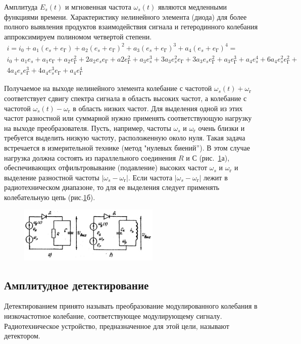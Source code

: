 Амплитуда $E_s(t)$ и мгновенная частота $\omega_s(t)$ являются медленными функциями времени. Характеристику нелинейного элемента (диода) для более полного выявления продуктов взаимодействия сигнала и гетеродинного колебания аппроксимируем полиномом четвертой степени.
\begin{gather}
	i=i_0+a_1(e_s+e_{\text{Г}})+a_2(e_s+e_{\text{Г}})^2+
	a_3(e_s+e_{\text{Г}})^3
	+a_4(e_s+e_{\text{Г}})^4= \\
	i_0+a_1e_s+a_1e_{\text{Г}}+a_2e_{\text{Г}}^2+
	2a_2e_se_{\text{Г}}+a2e_{\text{Г}}^2+a_3e_s^3+
	3a_3e_s^2e_{\text{Г}}+3a_3e_se_{\text{Г}}^2+
	a_3e_{\text{Г}}^3+a_4e_s^4+6a_4e_s^2e_{\text{Г}}^2+\\
	4a_4e_se_{\text{Г}}^3+4a_4e_s^3e_{\text{Г}}+a_4e_{\text{Г}}^4
\end{gather}

Получаемое на выходе нелинейного элемента колебание с частотой $\omega_s(t)+\omega_{\text{г}}$ соответствует сдвигу спектра сигнала в область высоких частот, а колебание с частотой $\omega_s(t)-\omega_{\text{г}}$ в область низких частот. Для выделения одной из этих частот разностной или суммарной нужно применять соответствующую нагрузку на выходе преобразователя. Пусть, например, частоты $\omega_s$ и $\omega_{\text{г}}$ очень близки и требуется выделить низкую частоту, расположенную около нуля. Такая задача встречается в измерительной технике (метод "нулевых биений”). В этом случае нагрузка должна состоять из параллельного соединения $R$ и $С$ (рис.~\ref{pic:7}а), обеспечивающих отфильтровывание (подавление) высоких частот $\omega_s$ и $\omega_{\text{г}}$ и выделение разностной частоты $|\omega_s - \omega_{\text{г}}|$. Если частота	$|\omega_s - \omega_{\text{г}}|$ лежит в радиотехническом диапазоне, то для ее выделения следует применять колебательную цепь (рис.\ref{pic:7}б).
\begin{figure}[h!]
	\centering
	\includegraphics[width=0.6\textwidth]{picture/pic7.jpg}
	\caption{}
	\label{pic:7}
\end{figure}
\subsection{Амплитудное детектирование}
Детектированием принято называть преобразование модулированного колебания в
низкочастотное колебание, соответствующее модулирующему сигналу. Радиотехническое устройство, предназначенное для этой цели, называют детектором.

